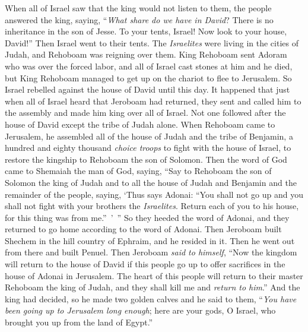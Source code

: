 \begin{biblechapter}
\verse When all of Israel saw that the king would not listen to them, the people answered the king, saying, “\textit{What share do we have in David}? There is no inheritance in the son of Jesse. To your tents, Israel! Now look to your house, David!” Then Israel went to their tents.
\verse The \textit{Israelites} were living in the cities of Judah, and Rehoboam was reigning over them.
\verse King Rehoboam sent Adoram who was over the forced labor, and all of Israel cast stones at him and he died, but King Rehoboam managed to get up on the chariot to flee to Jerusalem.
\verse So Israel rebelled against the house of David until this day.
 It happened that just when all of Israel heard that Jeroboam had returned, they sent and called him to the assembly and made him king over all of Israel. Not one followed after the house of David except the tribe of Judah alone.
\verse When Rehoboam came to Jerusalem, he assembled all of the house of Judah and the tribe of Benjamin, a hundred and eighty thousand \textit{choice troops} to fight with the house of Israel, to restore the kingship to Rehoboam the son of Solomon.
\verse Then the word of God came to Shemaiah the man of God, saying,
\verse “Say to Rehoboam the son of Solomon the king of Judah and to all the house of Judah and Benjamin and the remainder of the people, saying,
\verse ‘Thus says Adonai: “You shall not go up and you shall not fight with your brothers the \textit{Israelites}. Return each of you to his house, for this thing was from me.” ’ ” So they heeded the word of Adonai, and they returned to go home according to the word of Adonai.
 Then Jeroboam built Shechem in the hill country of Ephraim, and he resided in it. Then he went out from there and built Penuel.
\verse Then Jeroboam \textit{said to himself}, “Now the kingdom will return to the house of David
\verse if this people go up to offer sacrifices in the house of Adonai in Jerusalem. The heart of this people will return to their master Rehoboam the king of Judah, and they shall kill me and \textit{return to him}.”
\verse And the king had decided, so he made two golden calves and he said to them, “\textit{You have been going up to Jerusalem long enough}; here are your gods, O Israel, who brought you up from the land of Egypt.”

\end{biblechapter}

